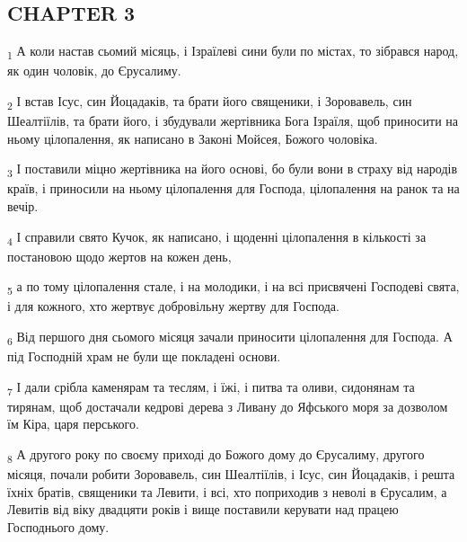 \subsection{CHAPTER 3}
\begin{tcolorbox}
\textsubscript{1} А коли настав сьомий місяць, і Ізраїлеві сини були по містах, то зібрався народ, як один чоловік, до Єрусалиму.
\end{tcolorbox}
\begin{tcolorbox}
\textsubscript{2} І встав Ісус, син Йоцадаків, та брати його священики, і Зоровавель, син Шеалтіїлів, та брати його, і збудували жертівника Бога Ізраїля, щоб приносити на ньому цілопалення, як написано в Законі Мойсея, Божого чоловіка.
\end{tcolorbox}
\begin{tcolorbox}
\textsubscript{3} І поставили міцно жертівника на його основі, бо були вони в страху від народів країв, і приносили на ньому цілопалення для Господа, цілопалення на ранок та на вечір.
\end{tcolorbox}
\begin{tcolorbox}
\textsubscript{4} І справили свято Кучок, як написано, і щоденні цілопалення в кількості за постановою щодо жертов на кожен день,
\end{tcolorbox}
\begin{tcolorbox}
\textsubscript{5} а по тому цілопалення стале, і на молодики, і на всі присвячені Господеві свята, і для кожного, хто жертвує добровільну жертву для Господа.
\end{tcolorbox}
\begin{tcolorbox}
\textsubscript{6} Від першого дня сьомого місяця зачали приносити цілопалення для Господа. А під Господній храм не були ще покладені основи.
\end{tcolorbox}
\begin{tcolorbox}
\textsubscript{7} І дали срібла каменярам та теслям, і їжі, і питва та оливи, сидонянам та тирянам, щоб достачали кедрові дерева з Ливану до Яфського моря за дозволом їм Кіра, царя перського.
\end{tcolorbox}
\begin{tcolorbox}
\textsubscript{8} А другого року по своєму приході до Божого дому до Єрусалиму, другого місяця, почали робити Зоровавель, син Шеалтіїлів, і Ісус, син Йоцадаків, і решта їхніх братів, священики та Левити, і всі, хто поприходив з неволі в Єрусалим, а Левитів від віку двадцяти років і вище поставили керувати над працею Господнього дому.
\end{tcolorbox}

